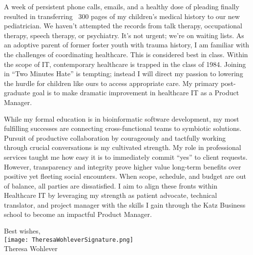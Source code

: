 \documentclass[10pt,letterpaper]{article}
\begin{document}
\begin{flushleft}

	A week of persistent phone calls, emails, and a healthy dose of pleading finally resulted in transferring ~300 pages of my children’s medical history to our new pediatrician. We haven’t attempted the records from talk therapy, occupational therapy, speech therapy, or psychiatry. It’s not urgent; we’re on waiting lists. As an adoptive parent of former foster youth with trauma history, I am familiar with the challenges of coordinating healthcare. This is considered best in class. Within the scope of IT, contemporary healthcare is trapped in the class of 1984. Joining in “Two Minutes Hate” is tempting; instead I will direct my passion to lowering the hurdle for children like ours to access appropriate care. My primary post-graduate goal is to make dramatic improvement in healthcare IT as a Product Manager.

	While my formal education is in bioinformatic software development, my most fulfilling successes are connecting cross-functional teams to symbiotic solutions. Pursuit of productive collaboration by courageously and tactfully working through crucial conversations is my cultivated strength. My role in professional services taught me how easy it is to immediately commit “yes” to client requests. However, transparency and integrity prove higher value long-term benefits over positive yet fleeting social encounters. When scope, schedule, and budget are out of balance, all parties are dissatisfied. I aim to align these fronts within Healthcare IT by leveraging my strength as patient advocate, technical translator, and project manager with the skills I gain through the Katz Business school to become an impactful Product Manager.
	



\end{flushleft}




\hspace*{.6\linewidth} Best wishes, \\
\hspace*{.57\linewidth} \texttt{[image: TheresaWohleverSignature.png]}  {\vspace{-9pt}} \\
\hspace*{.6\linewidth}  Theresa Wohlever
\end{document}
